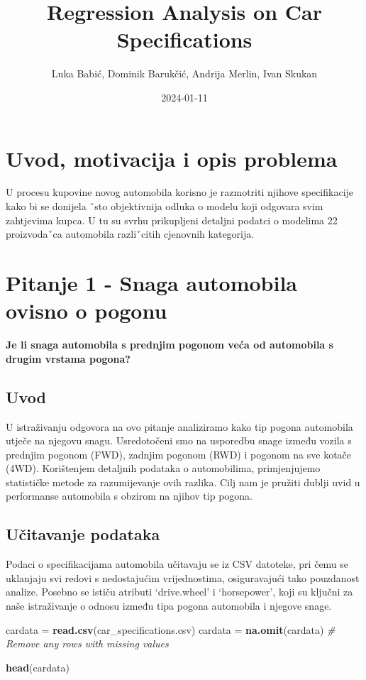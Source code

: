 \documentclass[
]{article}
\title{Regression Analysis on Car Specifications}
\author{Luka Babić, Dominik Barukčić, Andrija Merlin, Ivan Skukan}
\date{2024-01-11}
\newenvironment{Shaded}{\begin{snugshade}}{\end{snugshade}}
\newcommand{\CommentTok}[1]{\textcolor[rgb]{0.56,0.35,0.01}{\textit{#1}}}
\newcommand{\FunctionTok}[1]{\textcolor[rgb]{0.13,0.29,0.53}{\textbf{#1}}}
\newcommand{\NormalTok}[1]{#1}
\newcommand{\OtherTok}[1]{\textcolor[rgb]{0.56,0.35,0.01}{#1}}
\newcommand{\StringTok}[1]{\textcolor[rgb]{0.31,0.60,0.02}{#1}}
\begin{document}
\maketitle

\section{Uvod, motivacija i opis
problema}\label{uvod-motivacija-i-opis-problema}

U procesu kupovine novog automobila korisno je razmotriti njihove
specifikacije kako bi se donijela ˇsto objektivnija odluka o modelu koji
odgovara svim zahtjevima kupca. U tu su svrhu prikupljeni detaljni
podatci o modelima 22 proizvodaˇca automobila razliˇcitih cjenovnih
kategorija.

\section{Pitanje 1 - Snaga automobila ovisno o
pogonu}\label{pitanje-1---snaga-automobila-ovisno-o-pogonu}

\textbf{Je li snaga automobila s prednjim pogonom veća od automobila s
drugim vrstama pogona?}

\subsection{Uvod}\label{uvod}

U istraživanju odgovora na ovo pitanje analiziramo kako tip pogona
automobila utječe na njegovu snagu. Usredotočeni smo na usporedbu snage
između vozila s prednjim pogonom (FWD), zadnjim pogonom (RWD) i pogonom
na sve kotače (4WD). Korištenjem detaljnih podataka o automobilima,
primjenjujemo statističke metode za razumijevanje ovih razlika. Cilj nam
je pružiti dublji uvid u performanse automobila s obzirom na njihov tip
pogona.

\subsection{Učitavanje podataka}\label{uux10ditavanje-podataka}

Podaci o specifikacijama automobila učitavaju se iz CSV datoteke, pri
čemu se uklanjaju svi redovi s nedostajućim vrijednostima, osiguravajući
tako pouzdanost analize. Posebno se ističu atributi `drive.wheel' i
`horsepower', koji su ključni za naše istraživanje o odnosu između tipa
pogona automobila i njegove snage.

\begin{Shaded}
\begin{Highlighting}[]
\NormalTok{cardata }\OtherTok{=} \FunctionTok{read.csv}\NormalTok{(}\StringTok{\textquotesingle{}car\_specifications.csv\textquotesingle{}}\NormalTok{)}
\NormalTok{cardata }\OtherTok{=} \FunctionTok{na.omit}\NormalTok{(cardata)  }\CommentTok{\# Remove any rows with missing values}

\FunctionTok{head}\NormalTok{(cardata)}
\end{Highlighting}
\end{Shaded}
\end{document}
